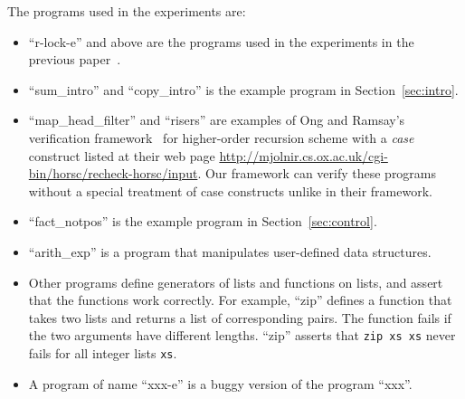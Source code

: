 The programs used in the experiments are:
\begin{itemize}
\item ``r-lock-e'' and above are the programs used in the experiments in
      the previous paper~\cite{KobayashiPLDI2011}.
\item ``sum\_intro'' and ``copy\_intro'' is the example program in Section~\ref{sec:intro}.
\item ``map\_head\_filter'' and ``risers'' are examples of Ong and
      Ramsay's verification framework~\cite{Ong2011} for higher-order
      recursion scheme with a \textit{case} construct listed at their
      web page
      \url{http://mjolnir.cs.ox.ac.uk/cgi-bin/horsc/recheck-horsc/input}.
      Our framework can verify these programs without a special
      treatment of case constructs unlike in their framework.
\item ``fact\_notpos'' is the example program in Section~\ref{sec:control}.
\item ``arith\_exp'' is a program that manipulates user-defined data structures.
\item Other programs define generators of lists and functions on lists,
      and assert that the functions work correctly.  For example,
      ``zip'' defines a function that takes two lists and returns a list of corresponding pairs.
      The function fails if the two arguments have different lengths.
      ``zip'' asserts that \texttt{zip xs xs} never fails for all integer lists \texttt{xs}.
\item A program of name ``xxx-e'' is a buggy version of the program ``xxx''.
\end{itemize}
